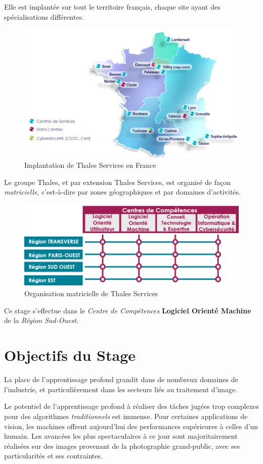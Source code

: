 \documentclass[a4paper, 11pt]{report}
\begin{document}
Elle est implantée sur tout le territoire français, chaque site ayant des spécialisations différentes.
\begin{figure}[H]
	\centering
	\includegraphics[scale=0.9]{Images/TS_France.png}
	\caption{Implantation de Thales Services en France}
\end{figure}
Le groupe Thales, et par extension Thales Services, est organisé de façon \emph{matricielle}, c'est-à-dire par zones géographiques et par domaines d'activités.
\begin{figure}[H]
	\centering
	\includegraphics[scale=0.7]{Images/Matrice_Thales_Services.png}
	\caption{Organisation matricielle de Thales Services}
\end{figure}
Ce stage s'effectue dans le \emph{Centre de Compétences} \textbf{Logiciel Orienté Machine} de la \emph{Région Sud-Ouest}.
\section{Objectifs du Stage}
La place de l'apprentissage profond grandit dans de nombreux domaines de l'industrie, et particulièrement dans les secteurs liés au traitement d'image.

Le potentiel de l'apprentissage profond à réaliser des tâches jugées trop complexes pour des algorithmes \emph{traditionnels} est immense.
Pour certaines applications de vision, les machines offrent aujourd'hui des performances supérieures à celles d'un humain.
Les avancées les plus spectaculaires à ce jour sont majoritairement réalisées sur des images provenant de la photographie grand-public, avec ses particularités et ses contraintes.
\end{document}
